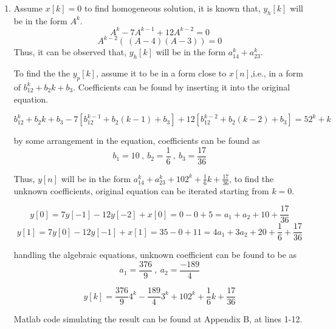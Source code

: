 \documentclass[a4paper,12pt]{article}
\begin{document}
\begin{enumerate}
		\begin{enumerate}
			\item Assume $x[k]=0$ to find homogeneous solution, it is known that, $y_h[k]$ will be in the form $A^k$.
			$$	A^k-7A^{k-1}+12A^{k-2}=0	$$
			$$	A^{k-2}\left(\ (A-4)(A-3) \right)=0$$
			Thus, it can be observed that, $y_h[k]$ will be in the form $a_14^k+a_23^k$.
			
			To find the the $y_p[k]$, assume it to be in a form close to $x[n]$,i.e., in a form of $b_12^k+b_2k+b_3$. Coefficients can be found by inserting it into the original equation.
			
			$$	b_12^k+b_2k+b_3-7[b_12^{k-1}+b_2(k-1)+b_3]+12[b_12^{k-2}+b_2(k-2)+b_3]=52^k+k	$$
			
			by some arrangement in the equation, coefficients can be found as 
			$$	\boxed{b_1=10} \ , \ \boxed{b_2=\frac{1}{6}} \ , \ \boxed{b_3=\frac{17}{36}}	$$
			
			Thus, $y[n]$ will be in the form $a_14^k+a_23^k+102^k+\frac{1}{6}k+\frac{17}{36} $, to find the unknown coefficients, original equation can be iterated starting from $k=0$.
			
			$$	y[0]=7y[-1]-12y[-2]+x[0]=0-0+5=a_1+a_2+10+\frac{17}{36}$$ 
			$$	y[1]=7y[0]-12y[-1]+x[1]=35-0+11=4a_1+3a_2+20+\frac{1}{6}+\frac{17}{36}$$
			
			handling the algebraic equations, unknown coefficient can be found to be as  
			$$	\boxed{a_1=\frac{376}{9}} \ , \ \boxed{a_2=\frac{-189}{4}} 	$$
			
			$$\boxed{	y[k]=\frac{376}{9}4^k-\frac{189}{4}3^k+102^k+\frac{1}{6}k+\frac{17}{36}	}$$
	
			Matlab code simulating the result can be found at Appendix B, at lines 1-12.			
			

\end{enumerate}
\end{enumerate}
\end{document}
